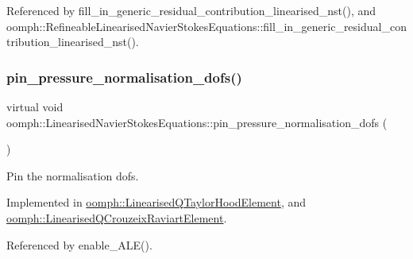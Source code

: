 Referenced by fill\+\_\+in\+\_\+generic\+\_\+residual\+\_\+contribution\+\_\+linearised\+\_\+nst(), and oomph\+::\+Refineable\+Linearised\+Navier\+Stokes\+Equations\+::fill\+\_\+in\+\_\+generic\+\_\+residual\+\_\+contribution\+\_\+linearised\+\_\+nst().

\mbox{\label{classoomph_1_1LinearisedNavierStokesEquations_a811cc53be5ee3239d31185b6264584f6}} 
\subsubsection{\texorpdfstring{pin\+\_\+pressure\+\_\+normalisation\+\_\+dofs()}{pin\_pressure\_normalisation\_dofs()}}
{\footnotesize\ttfamily virtual void oomph\+::\+Linearised\+Navier\+Stokes\+Equations\+::pin\+\_\+pressure\+\_\+normalisation\+\_\+dofs (\begin{DoxyParamCaption}{ }\end{DoxyParamCaption})\hspace{0.3cm}{\ttfamily [pure virtual]}}



Pin the normalisation dofs. 



Implemented in \hyperlink{classoomph_1_1LinearisedQTaylorHoodElement_a21bc414ed57b79f986d4f1bff6cece4b}{oomph\+::\+Linearised\+Q\+Taylor\+Hood\+Element}, and \hyperlink{classoomph_1_1LinearisedQCrouzeixRaviartElement_ae0a83b6da9fd010ced94a576d8c3a997}{oomph\+::\+Linearised\+Q\+Crouzeix\+Raviart\+Element}.



Referenced by enable\+\_\+\+A\+L\+E().

\mbox{\label{classoomph_1_1LinearisedNavierStokesEquations_a202921e1739b6aa174e1b64ebb1b14cd}} 
